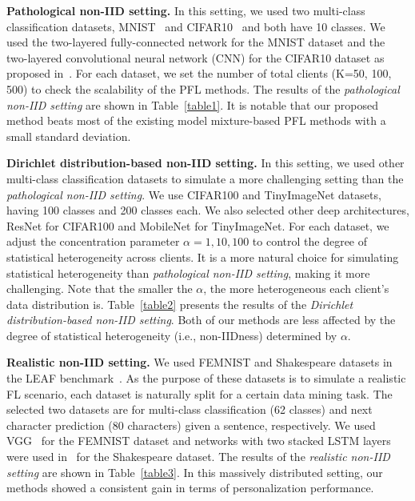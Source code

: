 \documentclass[sigconf]{acmart}
\begin{document}
\medskip 
\noindent\textbf{Pathological non-IID setting.} In this setting, we used two multi-class classification datasets, MNIST~\cite{mnist} and CIFAR10~\cite{cifar} and both have 10 classes. We used the two-layered fully-connected network for the MNIST dataset and the two-layered convolutional neural network (CNN) for the CIFAR10 dataset as proposed in~\cite{mc+17}. For each dataset, we set the number of total clients ($\mathrm{K}$=50, 100, 500) to check the scalability of the PFL methods. 
The results of the \textit{pathological non-IID setting} are shown in Table~\ref{table1}. It is notable that our proposed method beats most of the existing model mixture-based PFL methods with a small standard deviation.

\smallskip 
\noindent\textbf{Dirichlet distribution-based non-IID setting.} In this setting, we used other multi-class classification datasets to simulate a more challenging setting than the \textit{pathological non-IID setting}. We use CIFAR100\cite{cifar} and TinyImageNet\cite{tinyimagenet} datasets, having 100 classes and 200 classes each. We also selected other deep architectures, ResNet\cite{resnet} for CIFAR100 and MobileNet\cite{mobilenet} for TinyImageNet. For each dataset, we adjust the concentration parameter $\alpha={1, 10, 100}$ to control the degree of statistical heterogeneity across clients. It is a more natural choice for simulating statistical heterogeneity than \textit{pathological non-IID setting}, making it more challenging. Note that the smaller the $\alpha$, the more heterogeneous each client's data distribution is. Table~\ref{table2} presents the results of the \textit{Dirichlet distribution-based non-IID setting}. Both of our methods are less affected by the degree of statistical heterogeneity (i.e., non-IIDness) determined by $\alpha$.

\medskip
\noindent\textbf{Realistic non-IID setting.} We used FEMNIST and Shakespeare datasets in the LEAF benchmark~\cite{leaf}. As the purpose of these datasets is to simulate a realistic FL scenario, each dataset is naturally split for a certain data mining task. The selected two datasets are for multi-class classification (62 classes) and next character prediction (80 characters) given a sentence, respectively. We used VGG~\cite{vgg} for the FEMNIST dataset and networks with two stacked LSTM layers were used in~\cite{mc+17} for the Shakespeare dataset. The results of the \textit{realistic non-IID setting} are shown in Table~\ref{table3}. In this massively distributed setting, our methods showed a consistent gain in terms of personalization performance.
\end{document}
